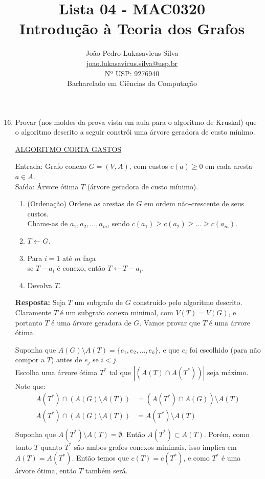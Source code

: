 \documentclass{article}
\title{
    Lista 04 - MAC0320\\
    Introdução à Teoria dos Grafos
}
\author{
    João Pedro Lukasavicus Silva\\
    \href{mailto:joao.lukasavicus.silva@usp.br}
    {joao.lukasavicus.silva@usp.br}\\
    Nº USP: 9276940\\
    Bacharelado em Ciências da Computação
}
\begin{document}
\maketitle

\begin{enumerate}[itemsep=3ex, label=E\textbf{\arabic*}.]
    \setcounter{enumi}{15}
    \item 
    Provar (nos moldes da prova vista em aula para o algoritmo de Kruskal) que o algoritmo descrito a seguir constrói uma árvore geradora de custo mínimo.

    \underline{ALGORITMO CORTA GASTOS}

    Entrada: Grafo conexo $G = (V, A)$, com custos $c(a) \geq 0$ em cada aresta $a \in A$.\\
    Saída: Árvore ótima $T$ (árvore geradora de custo mínimo).

    \begin{enumerate}[label=\arabic*.]
        \item (Ordenação) Ordene as arestas de $G$ em ordem não-crescente de seus custos.\\
        Chame-as de $a_1, a_2, \ldots, a_m$, sendo $c(a_1) \geq c(a_2) \geq \ldots \geq c(a_m)$.

        \item $T \leftarrow G$.

        \item Para $i = 1$ até $m$ faça\\
        se $T - a_i$ é conexo, então $T \leftarrow T - a_i$.

        \item Devolva $T$.
    \end{enumerate}

    \textbf{Resposta:} Seja $T$ um subgrafo de $G$ construído pelo algoritmo descrito. Claramente $T$ é um subgrafo conexo minimal, com $V(T) = V(G)$, e portanto $T$ é uma árvore geradora de $G$. Vamos provar que $T$ é uma árvore ótima.

    Suponha que $A(G) \setminus A(T) = \{e_1, e_2, \ldots, e_k\}$, e que $e_i$ foi escolhido (para não compor a $T$) antes de $e_j$ se $i < j$.\\
    Escolha uma árvore ótima $T^*$ tal que $|(A(T) \cap A(T^*))|$ seja máximo.\\
    Note que:
    \begin{align*}
        A(T^*) \cap (A(G) \setminus A(T)) &= (A(T^*) \cap A(G)) \setminus A(T)\\
        A(T^*) \cap (A(G) \setminus A(T)) &= A(T^*)  \setminus A(T)\\
    \end{align*}
    Suponha que $A(T^*)  \setminus A(T) = \emptyset$. Então $A(T^*) \subset A(T)$. Porém, como tanto $T$ quanto $T^*$ são ambos grafos conexos minimais, isso implica em $A(T) = A(T^*)$. Então temos que $c(T) = c(T^*)$, e como $T^*$ é uma árvore ótima, então $T$ também será.


\end{enumerate}
\end{document}
